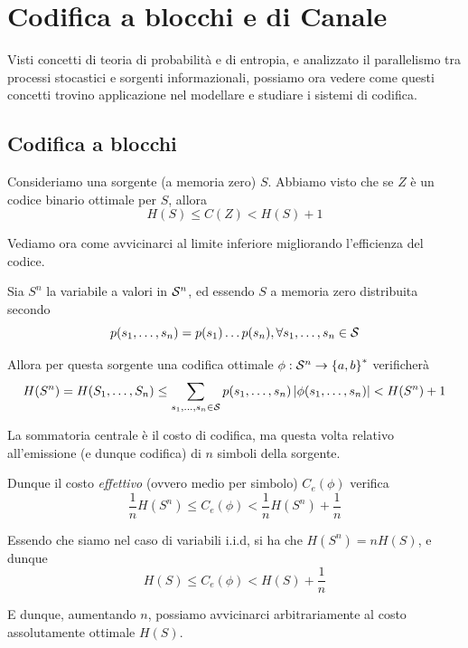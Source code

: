 \chapter{Codifica a blocchi e di Canale}

Visti concetti di teoria di probabilità e di entropia, e analizzato il parallelismo tra processi stocastici e sorgenti informazionali, possiamo ora vedere come questi concetti trovino applicazione nel modellare e studiare i sistemi di codifica.

\section{Codifica a blocchi}

Consideriamo una sorgente (a memoria zero) \(S\). Abbiamo visto che se \(Z\) è un codice binario ottimale per \(S\), allora
\[H(S)\leq C(Z)<H(S)+1\]

Vediamo ora come avvicinarci al limite inferiore migliorando l'efficienza del codice.

Sia \(S^n\) la variabile a valori in \(\mathcal{S}^n\), ed essendo \(S\) a memoria zero distribuita secondo 
\[p(s_1, \ldots, s_n) = p(s_1)\ldots p(s_n), \forall s_1, \ldots, s_n \in \mathcal{S}\]

Allora per questa sorgente una codifica ottimale \(\phi: \SCal^n \to \set{a,b}^*\) verificherà
\[H(S^n) = H(S_1, \ldots, S_n) \leq \sum_{s_1, \ldots, s_n \in \mathcal{S}} p(s_1, \ldots, s_n) \left|\phi(s_1, \ldots, s_n)\right| < H(S^n) + 1\]

La sommatoria centrale è il costo di codifica, ma questa volta relativo all'emissione (e dunque codifica) di \(n\) simboli della sorgente.

Dunque il costo \textit{effettivo} (ovvero medio per simbolo) \(C_e(\phi)\) verifica
\[\frac{1}{n} H(S^n) \leq C_e(\phi) < \frac{1}{n} H(S^n) + \frac{1}{n}\]

Essendo che siamo nel caso di variabili i.i.d, si ha che \(H(S^n) = n H(S)\), e dunque
\[H(S) \leq C_e(\phi) < H(S) + \frac{1}{n}\]

E dunque, aumentando \(n\), possiamo avvicinarci arbitrariamente al costo assolutamente ottimale \(H(S)\).

